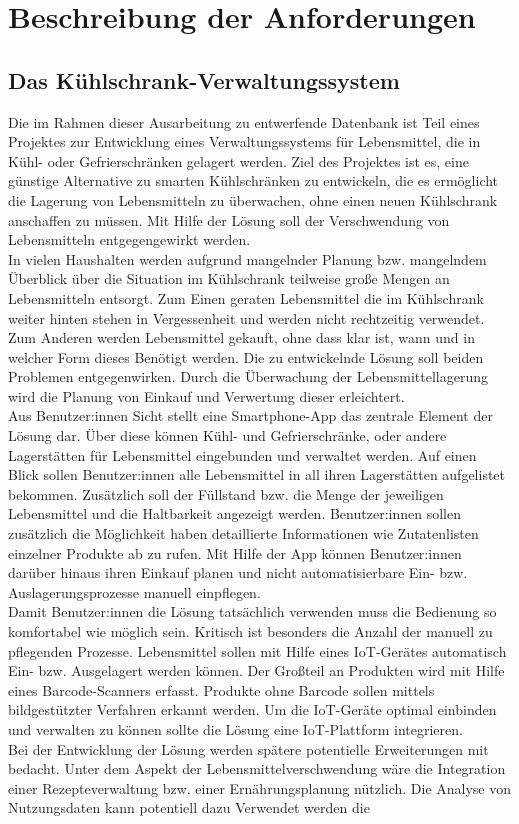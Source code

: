\chapter{Beschreibung der Anforderungen}\label{ch:Beschreibung der Anforderungen}
\section{Das Kühlschrank-Verwaltungssystem}\label{sec:Das Kühlschrank-Verwaltungssystem}

Die im Rahmen dieser Ausarbeitung zu entwerfende Datenbank ist Teil eines Projektes zur Entwicklung eines Verwaltungssystems für Lebensmittel, die in Kühl- oder Gefrierschränken gelagert werden. Ziel des Projektes ist es, eine günstige Alternative zu smarten Kühlschränken zu entwickeln, die es ermöglicht die Lagerung von Lebensmitteln zu überwachen, ohne einen neuen Kühlschrank anschaffen zu müssen. Mit Hilfe der Lösung soll der Verschwendung von Lebensmitteln entgegengewirkt werden.\\ In vielen Haushalten werden aufgrund mangelnder Planung bzw. mangelndem Überblick über die Situation im Kühlschrank teilweise große Mengen an Lebensmitteln entsorgt. Zum Einen geraten Lebensmittel die im Kühlschrank weiter hinten stehen in Vergessenheit und werden nicht rechtzeitig verwendet. Zum Anderen werden Lebensmittel gekauft, ohne dass klar ist, wann und in welcher Form dieses Benötigt werden. Die zu entwickelnde Lösung soll beiden Problemen entgegenwirken. Durch die Überwachung der Lebensmittellagerung wird die Planung von Einkauf und Verwertung dieser erleichtert.\\ Aus Benutzer:innen Sicht stellt eine Smartphone-App das zentrale Element der Lösung dar. Über diese können Kühl- und Gefrierschränke, oder andere Lagerstätten für Lebensmittel eingebunden und verwaltet werden. Auf einen Blick sollen Benutzer:innen alle Lebensmittel in all ihren Lagerstätten aufgelistet bekommen. Zusätzlich soll der Füllstand bzw. die Menge der jeweiligen Lebensmittel und die Haltbarkeit angezeigt werden. Benutzer:innen sollen zusätzlich die Möglichkeit haben detaillierte Informationen wie Zutatenlisten einzelner Produkte ab zu rufen. Mit Hilfe der App können Benutzer:innen darüber hinaus ihren Einkauf planen und nicht automatisierbare Ein- bzw. Auslagerungsprozesse manuell einpflegen.\\ Damit Benutzer:innen die Lösung tatsächlich verwenden muss die Bedienung so komfortabel wie möglich sein. Kritisch ist besonders die Anzahl der manuell zu pflegenden Prozesse. Lebensmittel sollen mit Hilfe eines IoT-Gerätes automatisch Ein- bzw. Ausgelagert werden können. Der Großteil an Produkten wird mit Hilfe eines Barcode-Scanners erfasst. Produkte ohne Barcode sollen mittels bildgestützter Verfahren erkannt werden. Um die IoT-Geräte optimal einbinden und verwalten zu können sollte die Lösung eine IoT-Plattform integrieren.\\ Bei der Entwicklung der Lösung werden spätere potentielle Erweiterungen mit bedacht. Unter dem Aspekt der Lebensmittelverschwendung wäre die Integration einer Rezepteverwaltung bzw. einer Ernährungsplanung nützlich. Die Analyse von Nutzungsdaten kann potentiell dazu Verwendet werden die 